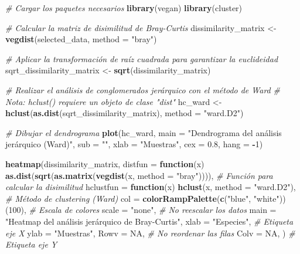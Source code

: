 \documentclass[
]{article}
\newenvironment{Shaded}{\begin{snugshade}}{\end{snugshade}}
\newcommand{\AttributeTok}[1]{\textcolor[rgb]{0.13,0.29,0.53}{#1}}
\newcommand{\CommentTok}[1]{\textcolor[rgb]{0.56,0.35,0.01}{\textit{#1}}}
\newcommand{\ConstantTok}[1]{\textcolor[rgb]{0.56,0.35,0.01}{#1}}
\newcommand{\ControlFlowTok}[1]{\textcolor[rgb]{0.13,0.29,0.53}{\textbf{#1}}}
\newcommand{\DecValTok}[1]{\textcolor[rgb]{0.00,0.00,0.81}{#1}}
\newcommand{\FloatTok}[1]{\textcolor[rgb]{0.00,0.00,0.81}{#1}}
\newcommand{\FunctionTok}[1]{\textcolor[rgb]{0.13,0.29,0.53}{\textbf{#1}}}
\newcommand{\NormalTok}[1]{#1}
\newcommand{\OtherTok}[1]{\textcolor[rgb]{0.56,0.35,0.01}{#1}}
\newcommand{\SpecialCharTok}[1]{\textcolor[rgb]{0.81,0.36,0.00}{\textbf{#1}}}
\newcommand{\StringTok}[1]{\textcolor[rgb]{0.31,0.60,0.02}{#1}}
\begin{document}
\begin{Shaded}
\begin{Highlighting}[]
\CommentTok{\# Cargar los paquetes necesarios}
\FunctionTok{library}\NormalTok{(vegan)}
\FunctionTok{library}\NormalTok{(cluster)}

\CommentTok{\# Calcular la matriz de disimilitud de Bray{-}Curtis}
\NormalTok{dissimilarity\_matrix }\OtherTok{\textless{}{-}} \FunctionTok{vegdist}\NormalTok{(selected\_data, }\AttributeTok{method =} \StringTok{"bray"}\NormalTok{)}

\CommentTok{\# Aplicar la transformación de raíz cuadrada para garantizar la euclideidad}
\NormalTok{sqrt\_dissimilarity\_matrix }\OtherTok{\textless{}{-}} \FunctionTok{sqrt}\NormalTok{(dissimilarity\_matrix)}

\CommentTok{\# Realizar el análisis de conglomerados jerárquico con el método de Ward}
\CommentTok{\# Nota: hclust() requiere un objeto de clase "dist"}
\NormalTok{hc\_ward }\OtherTok{\textless{}{-}} \FunctionTok{hclust}\NormalTok{(}\FunctionTok{as.dist}\NormalTok{(sqrt\_dissimilarity\_matrix), }\AttributeTok{method =} \StringTok{"ward.D2"}\NormalTok{)}

\CommentTok{\# Dibujar el dendrograma}
\FunctionTok{plot}\NormalTok{(hc\_ward, }\AttributeTok{main =} \StringTok{"Dendrograma del análisis jerárquico (Ward)"}\NormalTok{, }
     \AttributeTok{sub =} \StringTok{""}\NormalTok{, }\AttributeTok{xlab =} \StringTok{"Muestras"}\NormalTok{, }\AttributeTok{cex =} \FloatTok{0.8}\NormalTok{, }\AttributeTok{hang =} \SpecialCharTok{{-}}\DecValTok{1}\NormalTok{)}

\FunctionTok{heatmap}\NormalTok{(dissimilarity\_matrix,}
        \AttributeTok{distfun =} \ControlFlowTok{function}\NormalTok{(x) }\FunctionTok{as.dist}\NormalTok{(}\FunctionTok{sqrt}\NormalTok{(}\FunctionTok{as.matrix}\NormalTok{(}\FunctionTok{vegdist}\NormalTok{(x, }\AttributeTok{method =} \StringTok{"bray"}\NormalTok{)))), }\CommentTok{\# Función para calcular la disimilitud}
        \AttributeTok{hclustfun =} \ControlFlowTok{function}\NormalTok{(x) }\FunctionTok{hclust}\NormalTok{(x, }\AttributeTok{method =} \StringTok{"ward.D2"}\NormalTok{), }\CommentTok{\# Método de clustering (Ward)}
        \AttributeTok{col =} \FunctionTok{colorRampPalette}\NormalTok{(}\FunctionTok{c}\NormalTok{(}\StringTok{"blue"}\NormalTok{, }\StringTok{"white"}\NormalTok{))(}\DecValTok{100}\NormalTok{), }\CommentTok{\# Escala de colores}
        \AttributeTok{scale =} \StringTok{"none"}\NormalTok{, }\CommentTok{\# No reescalar los datos}
        \AttributeTok{main =} \StringTok{"Heatmap del análisis jerárquico de Bray{-}Curtis"}\NormalTok{,}
        \AttributeTok{xlab =} \StringTok{"Especies"}\NormalTok{, }\CommentTok{\# Etiqueta eje X}
        \AttributeTok{ylab =} \StringTok{"Muestras"}\NormalTok{,}
        \AttributeTok{Rowv =} \ConstantTok{NA}\NormalTok{,         }\CommentTok{\# No reordenar las filas}
        \AttributeTok{Colv =} \ConstantTok{NA}\NormalTok{,}
\NormalTok{        ) }\CommentTok{\# Etiqueta eje Y}
\end{Highlighting}
\end{Shaded}
\end{document}
